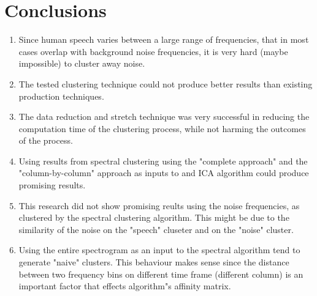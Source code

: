 \documentclass[10pt,twocolumn]{article}
\begin{document}
\section{Conclusions}
\begin{enumerate}
\item Since human speech varies between a large range of frequencies, that in most cases overlap with background noise frequencies, it is very hard (maybe impossible) to cluster away noise.
\item The tested clustering technique could not produce better results than existing production techniques.
\item The data reduction and stretch technique was very successful in reducing the computation time of the clustering process, while not harming the outcomes of the process.
\item Using results from spectral clustering using the "complete approach" and the "column-by-column" approach as inputs to and ICA algorithm could produce promising results.
\item This research did not show promising reults using the noise frequencies, as clustered by the spectral clustering algorithm. This might be due to the similarity of the noise on the "speech" cluseter and on the "noise" cluster.
\item Using the entire spectrogram as an input to the spectral algorithm tend to generate "naive" clusters. This behaviour makes sense since the distance between two frequency bins on different time frame (different column) is an important factor that effects algorithm"s affinity matrix.
\end{enumerate}



\end{document}
